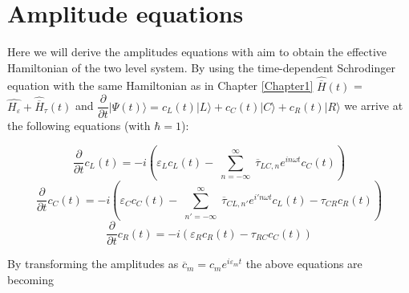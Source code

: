
\chapter{Amplitude equations} %

\label{Chapter2} %





 

Here we will derive the amplitudes equations with aim to obtain the effective Hamiltonian of the two level system. By using the time-dependent Schrodinger equation with the same Hamiltonian as in Chapter \ref{Chapter1} $\widehat{\overline{H}}(t)$ = $\widehat{H_{\varepsilon}} +\widehat{\overline{H}}_{\tau}(t)$ and $\dfrac{\partial}{\partial t} \vert \Psi (t) \rangle = c_L (t) \vert L \rangle + c_C (t) \vert C \rangle + c_R(t) \vert R \rangle$ we arrive at the following equations (with $\hbar=1$):

\begin{equation} \label{eq:2.1}
\dfrac{\partial}{\partial t} c_L (t) = -i \left( \varepsilon_L c_L(t) - \sum_{\substack{n=-\infty}}^{\infty} \overline{\tau}_{LC,n} e^{in\omega t } c_C (t) \right)
\end{equation}
\begin{equation} \label{eq:2.2}
\dfrac{\partial}{\partial t} c_C (t) = -i \left( \varepsilon_C c_C(t) - \sum_{\substack{n'=-\infty}}^{\infty} \overline{\tau}_{CL,n'} e^{i'n\omega t } c_L (t) -  {\tau}_{CR} c_R(t) \right)
\end{equation}
\begin{equation} \label{eq:2.3}
\dfrac{\partial}{\partial t} c_R (t) = -i \left( \varepsilon_R c_R(t) - {\tau}_{RC} c_C(t)  \right)
\end{equation}

By transforming the amplitudes as $\overline{c}_m = {c_m} e^{i \varepsilon_m t}$ the above equations are becoming 

